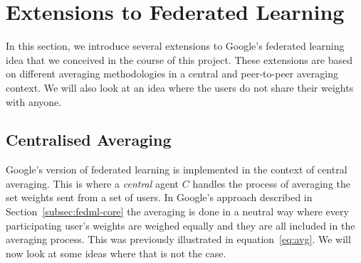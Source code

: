 \documentclass[12pt]{article}
\begin{document}
\section{Extensions to Federated Learning}\label{sec:ext-ideas}
In this section, we introduce several extensions to Google's federated learning idea that we conceived in the course of this project. These extensions are based on different averaging methodologies in a central and peer-to-peer averaging context. We will also look at an idea where the users do not share their weights with anyone.
\subsection{Centralised Averaging}
Google's version of federated learning is implemented in the context of central averaging. This is where a \textit{central} agent $C$ handles the process of averaging the set weights sent from a set of users. In Google's approach described in Section~\ref{subsec:fedml-core} the averaging is done in a neutral way where every participating user's weights are weighed equally and they are all included in the averaging process. This was previously illustrated in equation~\ref{eq:avg}. We will now look at some ideas where that is not the case. 
\end{document}
